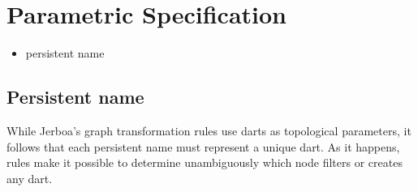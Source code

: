 
\section{Parametric Specification }

\begin{itemize}
  \item persistent name
\end{itemize}



\subsection{Persistent name}

While Jerboa's graph transformation rules use darts as topological parameters,
it follows that each persistent name must represent a unique dart. As it
happens, rules make it possible to determine unambiguously which node filters or
creates any dart.





